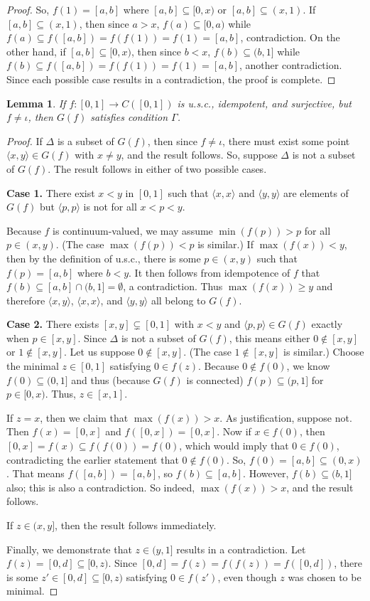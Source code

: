 \documentclass{amsart}
\newtheorem{lemma}[theorem]{Lemma}
\theoremstyle{definition}
\newcommand{\<}{\langle}
\renewcommand{\>}{\rangle}
\begin{document}
\begin{proof}
So, $f(1) = [a,b]$ where $[a,b] \subseteq [0,x)$ or $[a,b] \subseteq (x,1)$. If $[a,b] \subseteq (x,1)$, then since $a > x$, $f(a) \subseteq [0,a)$ while $f(a)\subseteq f([a,b])=f(f(1))=f(1)=[a,b]$, contradiction. On the other hand, if $[a,b] \subseteq [0,x)$, then since $b<x$, $f(b) \subseteq (b,1]$ while $f(b) \subseteq f([a,b])=f(f(1))=f(1)=[a,b]$, another contradiction. Since each possible case results in a contradiction, the proof is complete.
\end{proof}

\begin{lemma} \label{big lemma}
If $f: [0,1] \rightarrow C([0,1])$ is u.s.c., idempotent, and surjective, but $f \not=\iota$, then $G(f)$ satisfies condition $\Gamma$.
\end{lemma}

\begin{proof}
If $\Delta$ is a subset of $G(f)$, then since $f \not=\iota$, there must exist some point $\<x,y\> \in G(f)$ with $x \not= y$, and the result follows. So, suppose $\Delta$ is not a subset of $G(f)$. The result follows in either of two possible cases.

\textbf{Case 1.} There exist $x<y$ in $[0,1]$ such that $\<x,x\>$ and $\<y,y\>$ are elements of $G(f)$ but $\<p,p\>$ is not for all $x<p<y$.

Because $f$ is continuum-valued, we may assume $\min(f(p))>p$ for all $p\in(x,y)$. (The case $\max(f(p))<p$ is similar.) If $\max(f(x))<y$, then by the definition of u.s.c., there is some $p\in(x,y)$ such that $f(p)=[a,b]$ where $b<y$. It then follows from idempotence of $f$ that $f(b)\subseteq [a,b]\cap(b,1]=\emptyset$, a contradiction. Thus $\max(f(x))\geq y$ and therefore $\<x,y\>$, $\<x,x\>$, and $\<y,y\>$ all belong to $G(f)$.

\textbf{Case 2.} There exists $[x,y]\subsetneq[0,1]$ with $x<y$ and $\<p,p\>\in G(f)$ exactly when $p\in[x,y]$. Since $\Delta$ is not a subset of $G(f)$, this means either $0 \not\in [x,y]$ or $1 \not\in [x,y]$. Let us suppose $0\not\in[x,y]$. (The case $1\not\in[x,y]$ is similar.) Choose the minimal $z\in[0,1]$ satisfying $0\in f(z)$. Because $0 \not\in f(0)$, we know $f(0) \subseteq (0,1]$ and thus (because $G(f)$ is connected) $f(p) \subseteq (p,1]$ for $p \in [0,x)$. Thus, $z \in [x,1]$.

If $z=x$, then we claim that $\max(f(x))>x$. As justification, suppose not. Then $f(x) = [0,x]$ and $f([0,x]) = [0,x]$. Now if $x \in f(0)$, then $[0,x] = f(x) \subseteq f(f(0)) = f(0)$, which would imply that $0 \in f(0)$, contradicting the earlier statement that $0 \not\in f(0)$. So, $f(0) = [a,b] \subseteq (0,x)$. That means $f([a,b]) = [a,b]$, so $f(b) \subseteq [a,b]$. However, $f(b) \subseteq (b,1]$ also; this is also a contradiction. So indeed, $\max(f(x))>x$, and the result follows.

If $z\in(x,y]$, then the result follows immediately.

Finally, we demonstrate that $z\in(y,1]$ results in a contradiction. Let $f(z)=[0,d]\subseteq[0,z)$. Since $[0,d]=f(z)=f(f(z))=f([0,d])$, there is some $z'\in[0,d]\subseteq[0,z)$ satisfying $0\in f(z')$, even though $z$ was chosen to be minimal.
\end{proof}
\end{document}
